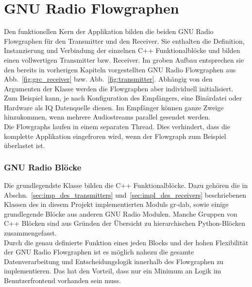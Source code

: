 \section{GNU Radio Flowgraphen}
Den funktionellen Kern der Applikation bilden die beiden GNU Radio Flowgraphen für den Transmitter und den Receiver. Sie enthalten die Definition, Instanzierung und Verbindung der einzelnen C++ Funktionalblöcke und bilden einen vollwertigen Transmitter bzw. Receiver. Im groben Aufbau entsprechen sie den bereits in vorherigen Kapiteln vorgestellten GNU Radio Flowgraphen aus Abb.~\ref{fig:grc_receiver} bzw. Abb.~\ref{fig:transmitter}. Abhängig von den Argumenten der Klasse werden die Flowgraphen aber individuell initialisiert. Zum Beispiel kann, je nach Konfiguration des Empfängers, eine Binärdatei oder Hardware als IQ Datenquelle dienen. Im Empfänger können ganze Zweige hinzukommen, wenn mehrere Audiostreams parallel gesendet werden.\\
Die Flowgraphs laufen in einem separaten Thread. Dies verhindert, dass die komplette Applikation eingefroren wird, wenn der Flowgraph zum Beispiel überlastet ist.

\subsubsection{GNU Radio Blöcke}
Die grundlegendste Klasse bilden die C++ Funktionalblöcke. Dazu gehören die in Abschn.~\ref{sec:imp_des_transmitters} und~\ref{sec:impl_des_receivers} beschriebenen Klassen des in diesem Projekt implementierten Moduls gr-dab, sowie einige grundlegende Blöcke aus anderen GNU Radio Modulen. Manche Gruppen von C++ Blöcken sind aus Gründen der Übersicht zu hierarchischen Python-Blöcken zusammengefasst.\\

Durch die genau definierte Funktion eines jeden Blocks und der hohen Flexibilität der GNU Radio Flowgraphen ist es möglich nahezu die gesamte Datenverarbeitung und Entscheidungslogik innerhalb des Flowgraphen zu implementieren. Das hat den Vorteil, dass nur ein Minimum an Logik im Benutzerfrontend vorhanden sein muss.


